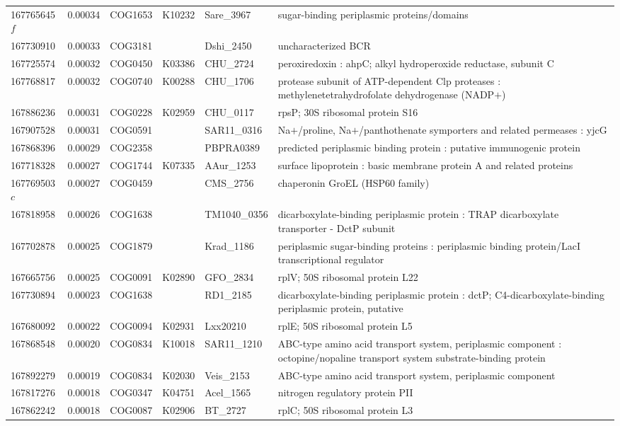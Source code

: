 \begin{landscape}
\begin{longtable}{p{1.6cm}p{1.2cm}p{1.5cm}p{1.5cm}p{2.8cm}p{13.5cm}}
167765645$f$&0.00034&COG1653&K10232&Sare\_3967&sugar-binding periplasmic proteins/domains \\
167730910&0.00033&COG3181&&Dshi\_2450&uncharacterized BCR \\
167725574&0.00032&COG0450&K03386&CHU\_2724&peroxiredoxin : ahpC; alkyl hydroperoxide reductase, subunit C \\
167768817&0.00032&COG0740&K00288&CHU\_1706&protease subunit of ATP-dependent Clp proteases : methylenetetrahydrofolate dehydrogenase (NADP$+$) \\
167886236&0.00031&COG0228&K02959&CHU\_0117&rpsP; 30S ribosomal protein S16 \\
167907528&0.00031&COG0591&&SAR11\_0316&Na$+$/proline, Na$+$/panthothenate symporters and related permeases : yjcG \\
167868396&0.00029&COG2358&&PBPRA0389&predicted periplasmic binding protein : putative immunogenic protein \\
167718328&0.00027&COG1744&K07335&AAur\_1253&surface lipoprotein : basic membrane protein A and related proteins \\
167769503$c$&0.00027&COG0459&&CMS\_2756&chaperonin GroEL (HSP60 family) \\
167818958&0.00026&COG1638&&TM1040\_0356&dicarboxylate-binding periplasmic protein : TRAP dicarboxylate transporter - DctP subunit \\
167702878&0.00025&COG1879&&Krad\_1186&periplasmic sugar-binding proteins : periplasmic binding protein/LacI transcriptional regulator \\
167665756&0.00025&COG0091&K02890&GFO\_2834&rplV; 50S ribosomal protein L22 \\
167730894&0.00023&COG1638&&RD1\_2185&dicarboxylate-binding periplasmic protein : dctP; C4-dicarboxylate-binding periplasmic protein, putative \\
167680092&0.00022&COG0094&K02931&Lxx20210&rplE; 50S ribosomal protein L5 \\
167868548&0.00020&COG0834&K10018&SAR11\_1210&ABC-type amino acid transport system, periplasmic component : octopine/nopaline transport system substrate-binding protein \\
167892279&0.00019&COG0834&K02030&Veis\_2153&ABC-type amino acid transport system, periplasmic component \\
167817276&0.00018&COG0347&K04751&Acel\_1565&nitrogen regulatory protein PII \\
167862242&0.00018&COG0087&K02906&BT\_2727&rplC; 50S ribosomal protein L3 \\

\end{longtable}
\end{landscape}
